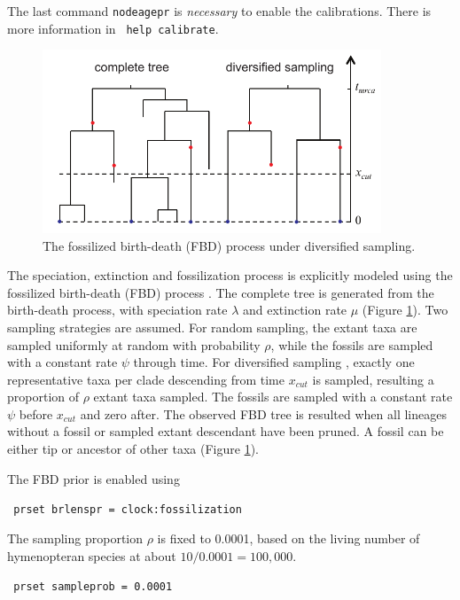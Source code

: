 \documentclass[12pt]{article}
\begin{document}
\noindent The last command {\tt nodeagepr} is {\it necessary} to enable the calibrations.
There is more information in {\tt \color{red} help calibrate}.

\begin{figure}[h]
\includegraphics[width=0.9\textwidth]{figures/fbdtree.pdf}
\caption{The fossilized birth-death (FBD) process under diversified sampling.}
\label{fig_fbdtree}
\end{figure}

The speciation, extinction and fossilization process is explicitly modeled using the fossilized birth-death (FBD) process \citep{Stadler:2010fn,Heath:2014hn,Gavryushkina:2014fw,Zhang:2016kf}.
The complete tree is generated from the birth-death process, with speciation rate $\lambda$ and extinction rate $\mu$ (Figure \ref{fig_fbdtree}). 
Two sampling strategies are assumed. For random sampling, the extant taxa are sampled uniformly at random with probability $\rho$, while the fossils are sampled with a constant rate $\psi$ through time.
For diversified sampling \citep{Zhang:2016kf}, exactly one representative taxa per clade descending from time $x_{cut}$ is sampled, resulting a proportion of $\rho$ extant taxa sampled.
The fossils are sampled with a constant rate $\psi$ before $x_{cut}$ and zero after.
The observed FBD tree is resulted when all lineages without a fossil or sampled extant descendant have been pruned.
A fossil can be either tip or ancestor of other taxa (Figure \ref{fig_fbdtree}).

The FBD prior is enabled using

\medskip
{\tt \color{red} \noindent
prset brlenspr = clock:fossilization
}
\medskip

\noindent The sampling proportion $\rho$ is fixed to 0.0001, based on the living number of hymenopteran species at about $10/0.0001=100,000$.

\medskip
{\tt \color{red} \noindent
prset sampleprob = 0.0001
}
\medskip
\end{document}
